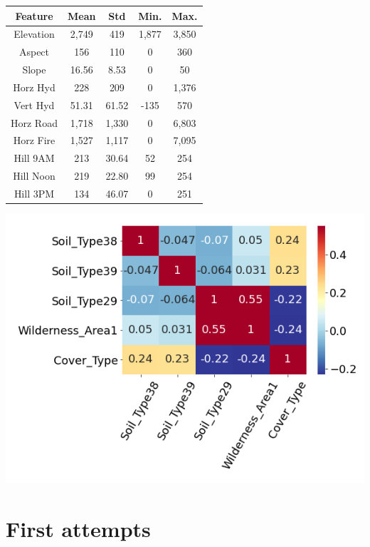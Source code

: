 \documentclass{article}
\newenvironment{Figure}
  {\par\medskip\noindent\minipage{\linewidth}}
  {\endminipage\par\medskip}
\begin{document}
\begin{multicols}{2}
\begin{center}
\captionsetup{type=tabular}
\begin{tabular}{|c|cccc|}
    \hline
    Feature & Mean & Std & Min. & Max. \\
    \hline
    Elevation & 2,749 & 419 & 1,877 & 3,850 \\
    Aspect & 156 & 110 & 0 & 360 \\
    Slope & 16.56 & 8.53 & 0 & 50 \\
    Horz Hyd & 228 & 209 & 0 & 1,376 \\
    Vert Hyd & 51.31 & 61.52 & -135 & 570 \\
    Horz Road & 1,718 & 1,330 & 0 & 6,803 \\
    Horz Fire & 1,527 & 1,117 & 0 & 7,095 \\
    Hill 9AM & 213 & 30.64 & 52 & 254 \\
    Hill Noon & 219 & 22.80 & 99 & 254 \\
    Hill 3PM & 134 & 46.07 & 0 & 251 \\
    \hline
\end{tabular}
\label{tab:featsum}
\end{center}

\begin{Figure}
    \centering
    \captionsetup{type=figure}
    \includegraphics[width=0.85\linewidth]{figures/basecorr.png}
    \label{fig:basecorr}
\end{Figure}

\section{First attempts}


\end{multicols}
\end{document}
